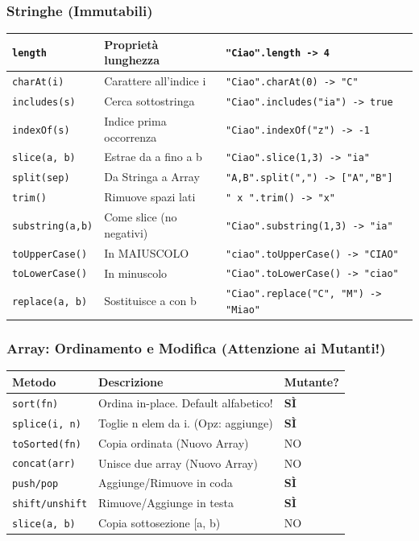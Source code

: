 \subsubsection{Stringhe (Immutabili)}
\begin{tabular}{|l|l|l|}
\hline
\texttt{length} & Proprietà lunghezza & \texttt{"Ciao".length -> 4} \\
\hline
\texttt{charAt(i)} & Carattere all'indice i & \texttt{"Ciao".charAt(0) -> "C"} \\
\hline
\texttt{includes(s)} & Cerca sottostringa & \texttt{"Ciao".includes("ia") -> true} \\
\hline
\texttt{indexOf(s)} & Indice prima occorrenza & \texttt{"Ciao".indexOf("z") -> -1} \\
\hline
\texttt{slice(a, b)} & Estrae da a fino a b & \texttt{"Ciao".slice(1,3) -> "ia"} \\
\hline
\texttt{split(sep)} & Da Stringa a Array & \texttt{"A,B".split(",") -> ["A","B"]} \\
\hline
\texttt{trim()} & Rimuove spazi lati & \texttt{" x ".trim() -> "x"} \\
\hline
\texttt{substring(a,b)} & Come slice (no negativi) & \texttt{"Ciao".substring(1,3) -> "ia"} \\
\hline
\texttt{toUpperCase()} & In MAIUSCOLO & \texttt{"ciao".toUpperCase() -> "CIAO"} \\
\hline
\texttt{toLowerCase()} & In minuscolo & \texttt{"Ciao".toLowerCase() -> "ciao"} \\
\hline
\texttt{replace(a, b)} & Sostituisce a con b & \texttt{"Ciao".replace("C", "M") -> "Miao"} \\
\hline
\end{tabular}

\subsubsection{Array: Ordinamento e Modifica (Attenzione ai Mutanti!)}
\begin{center}
\begin{tabular}{|l|p{6cm}|l|}
\hline
\textbf{Metodo} & \textbf{Descrizione} & \textbf{Mutante?} \\
\hline
\texttt{sort(fn)} & Ordina in-place. Default alfabetico! & \textbf{SÌ} \\
\hline
\texttt{splice(i, n)} & Toglie n elem da i. (Opz: aggiunge) & \textbf{SÌ} \\
\hline
\texttt{toSorted(fn)} & Copia ordinata (Nuovo Array) & NO \\
\hline
\texttt{concat(arr)} & Unisce due array (Nuovo Array) & NO \\
\hline
\texttt{push/pop} & Aggiunge/Rimuove in coda & \textbf{SÌ} \\
\hline
\texttt{shift/unshift} & Rimuove/Aggiunge in testa & \textbf{SÌ} \\
\hline
\texttt{slice(a, b)} & Copia sottosezione [a, b) & NO \\
\hline
\end{tabular}
\end{center}

